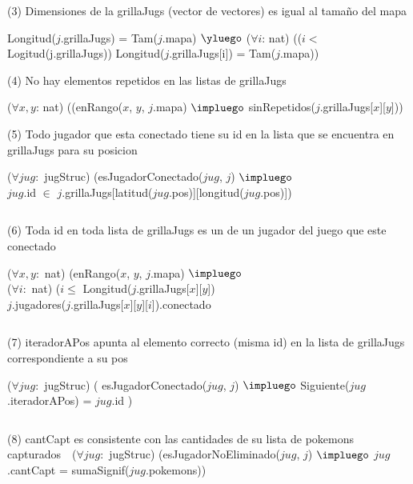 \begin{Representacion}
(3) Dimensiones de la grillaJugs (vector de vectores) es igual al tama\~no del mapa $ $\newline

Longitud($j$.grillaJugs) = Tam($j$.mapa) $\yluego$ 
($\forall i$: nat) (($i <$ Logitud(j.grillaJugs)) Longitud($j$.grillaJugs[i]) = Tam($j$.mapa)) 
$ $\newline


(4) No hay elementos repetidos en las listas de grillaJugs  $ $\newline

($\forall x, y$: nat) ((enRango($x$, $y$, $j$.mapa) $\impluego$ sinRepetidos($j$.grillaJugs[$x$][$y$]))
$ $\newline

(5) Todo jugador que esta conectado tiene su id en la lista que se encuentra en grillaJugs para su posicion  $ $\newline


($\forall jug:$ jugStruc) (esJugadorConectado($jug$, $j$) $\impluego$ \\
  $jug$.id $\in$ $j$.grillaJugs[latitud($jug$.pos)][longitud($jug$.pos)])
  
$ $\newline

(6) Toda id en toda lista de grillaJugs es un de un jugador del juego que este conectado  $ $\newline

($\forall x, y:$ nat) (enRango($x$, $y$, $j$.mapa) $\impluego$ \\
  ($\forall i:$ nat) ($i \leq$ Longitud($j$.grillaJugs[$x$][$y$]) \\
    $j$.jugadores($j$.grillaJugs[$x$][$y$][$i$]).conectado

$ $\newline

(7) iteradorAPos apunta al elemento correcto (misma id) en la lista de grillaJugs correspondiente a su pos $ $\newline

($\forall jug:$ jugStruc) ( esJugadorConectado($jug$, $j$) $\impluego$ Siguiente($jug$.iteradorAPos) = $jug$.id )

$ $\newline

(8) cantCapt es consistente con las cantidades de su lista de pokemons capturados $ $\newline
$ $\newline
($\forall jug:$ jugStruc) (esJugadorNoEliminado($jug$, $j$) $\impluego$ $jug$.cantCapt = sumaSignif($jug$.pokemons))
$ $\newline



\end{Representacion}
